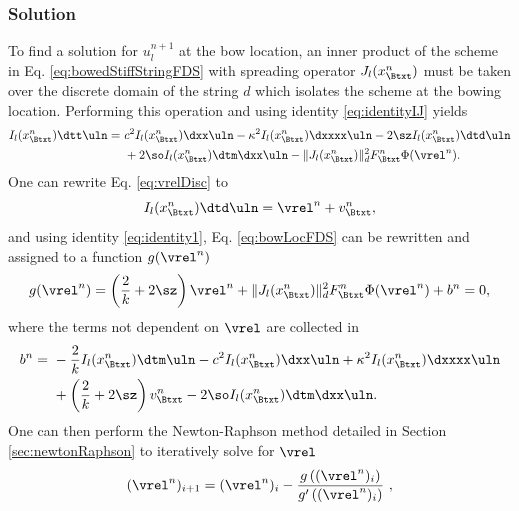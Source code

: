 \subsubsection{Solution}
To find a solution for $u_l^{n+1}$ at the bow location, an inner product of the scheme in Eq. \eqref{eq:bowedStiffStringFDS} with spreading operator $J_l(x_\Btxt^n)$ must be taken over the discrete domain of the string $d$ which isolates the scheme at the bowing location. Performing this operation and using identity \eqref{eq:identityIJ} yields
\begin{equation}\label{eq:bowLocFDS}
    \begin{aligned}
    I_l(x_\Btxt^n)\dtt\uln =\ &c^2 I_l(x_\Btxt^n)\dxx \uln - \kappa^2 I_l(x_\Btxt^n)\dxxxx \uln- 2 \sz I_l(x_\Btxt^n)\dtd \uln\\
    & + 2 \so I_l(x_\Btxt^n)\dtm\dxx \uln - \lVert J_l(x_\Btxt^n)\rVert^2_d F_\Btxt^n\Phi(\vrel^n).
    \end{aligned}
\end{equation}
One can rewrite Eq. \eqref{eq:vrelDisc} to 
\begin{equation}\label{eq:vrelRewritten}
   I_l(x_\Btxt^n)\dtd \uln =  \vrel^n + v_\Btxt^n,
\end{equation}
and using identity \eqref{eq:identity1}, Eq. \eqref{eq:bowLocFDS} can be rewritten and assigned to a function $g(\vrel^n)$ 
\begin{equation}\label{eq:staticFrictionNRfunc}
    g(\vrel^n) = \left(\frac{2}{k} + 2\sz\right)\vrel^n + \lVert J_l(x_\Btxt^n)\rVert^2_d F_\Btxt^n\Phi(\vrel^n) + b^n = 0,
\end{equation}
where the terms not dependent on $\vrel$ are collected in
\begin{align*}
    b^n =\ &-\frac{2}{k}I_l(x_\Btxt^n)\dtm \uln-c^2 I_l(x_\Btxt^n)\dxx \uln + \kappa^2 I_l(x_\Btxt^n)\dxxxx \uln \\
    &+ \left( \frac{2}{k} + 2 \sz \right)v_\Btxt^n - 2 \so I_l(x_\Btxt^n)\dtm\dxx \uln.
\end{align*}
%
One can then perform the Newton-Raphson method detailed in Section \ref{sec:newtonRaphson} to iteratively solve for $\vrel$ 
%
\begin{equation}
    (\vrel^n)_{i+1} = (\vrel^n)_i - \frac{g\left((\vrel^n)_i\right)}{g'\left((\vrel^n)_i\right)}\ ,
\end{equation}
